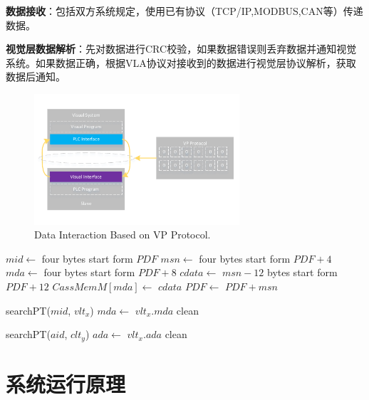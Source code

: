 \documentclass[journal,UTF8]{IEEEtran}
\begin{document}
\textbf{数据接收}：包括双方系统规定，使用已有协议（TCP/IP,MODBUS,CAN等）传递数据。

\textbf{视觉层数据解析}：先对数据进行CRC校验，如果数据错误则丢弃数据并通知视觉系统。如果数据正确，根据VLA协议对接收到的数据进行视觉层协议解析，获取数据后通知。
\begin{figure}
	\centering
	\includegraphics[width=3in]{fig/FlexibleLayer.pdf}
	\caption{ Data Interaction Based on VP Protocol.}
	\label{fig:FlexibleLayer}
\end{figure}
\begin{algorithm}
	\label{al4}
	\caption{$VLDeframing$}%
    $mid \leftarrow$ four bytes start form $PDF$\;
    $msn \leftarrow$ four bytes start form $PDF+4$\; 
    $mda \leftarrow$ four bytes start form $PDF+8$\;
    $cdata \leftarrow$ $msn-12$ bytes start form $PDF+12$\;
	$CassMemM[mda]\leftarrow$ $cdata$\;
	$PDF\leftarrow$ $PDF+msn$\;
\end{algorithm}

\begin{algorithm}
	\label{al5}
	\caption{$CLDeframing$}%
	searchPT($mid$, $vlt_x$)\;
	$mda\leftarrow$ $vlt_x.mda$\;
    clean\;
\end{algorithm}

\begin{algorithm}
	\label{al6}
	\caption{$ALDeframing$}%
	searchPT($aid$, $clt_y$)\;
	$ada\leftarrow$ $vlt_x.ada$\;
	clean\;
\end{algorithm}


\section{系统运行原理}
\label{Execution}
\end{document}
